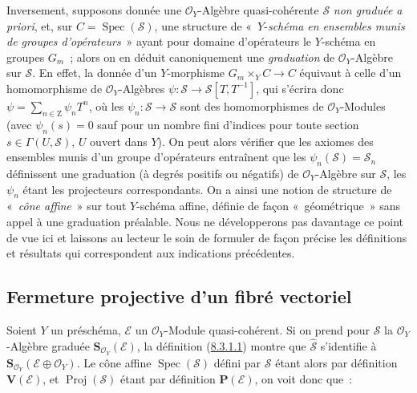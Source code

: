 \begin{remark}[8.3.9]
Inversement, supposons donnée une $\mathcal{O}_Y$-Algèbre quasi-cohérente
$\mathcal{S}$ \emph{non graduée a priori}, et, sur
$C=\operatorname{Spec}(\mathcal{S})$, une structure de «~$Y$-\emph{schéma en
ensembles munis de groupes d'opérateurs}~» ayant pour domaine
d'opérateurs le $Y$-schéma en groupes $G_m$~; alors on en déduit
canoniquement une \emph{graduation} de $\mathcal{O}_Y$-Algèbre sur
$\mathcal{S}$. En effet, la donnée d'un $Y$-morphisme $G_m\times_YC\to C$
équivaut à celle d'un homomorphisme de $\mathcal{O}_Y$-Algèbres
$\psi:\mathcal{S}\to\mathcal{S}[T,T^{-1}]$, qui s'écrira donc
$\psi=\sum_{n\in\mathrm{Z}}\psi_nT^n$, où les
$\psi_n:\mathcal{S}\to\mathcal{S}$ sont des homomorphismes de
$\mathcal{O}_Y$-Modules (avec $\psi_n(s)=0$ sauf pour un nombre fini d'indices
pour toute section $s\in\Gamma(U,\mathcal{S})$, $U$ ouvert dans $Y$). On peut
alors vérifier que les axiomes des ensembles munis d'un groupe d'opérateurs
entraînent que les $\psi_n(\mathcal{S})=\mathcal{S}_n$ définissent une
graduation (à degrés positifs ou négatifs) de $\mathcal{O}_Y$-Algèbre sur
$\mathcal{S}$, les $\psi_n$ étant les projecteurs correspondants. On a ainsi
une notion de structure de «~\emph{cône affine}~» sur tout $Y$-schéma affine,
définie de façon «~géométrique~» sans appel à une graduation préalable.
Nous ne développerons pas davantage ce point de vue ici et laissons au
lecteur le soin de formuler de façon précise les définitions et résultats qui
correspondent aux indications précédentes.
\end{remark}

\subsection{Fermeture projective d'un fibré vectoriel}
\label{subsection:II.8.4-fr}

\begin{env}[8.4.1]
\label{II.8.4.1-fr}
Soient $Y$ un préschéma, $\mathcal{E}$ un $\mathcal{O}_Y$-Module
quasi-cohérent. Si on prend pour $\mathcal{S}$ la $\mathcal{O}_Y$-Algèbre
graduée $\mathbf{S}_{\mathcal{O}_Y}(\mathcal{E})$, la définition
(\hyperref[II.8.3.1.1-fr]{8.3.1.1}) montre que
$\widehat{\mathcal{S}}$ s'identifie à
$\mathbf{S}_{\mathcal{O}_Y}(\mathcal{E}\oplus\mathcal{O}_Y)$. Le cône affine
$\operatorname{Spec}(\mathcal{S})$ défini par $\mathcal{S}$ étant alors par
définition $\mathbf{V}(\mathcal{E})$, et $\operatorname{Proj}(\mathcal{S})$
étant par définition $\mathbf{P}(\mathcal{E})$, on voit donc que~:
\end{env}

